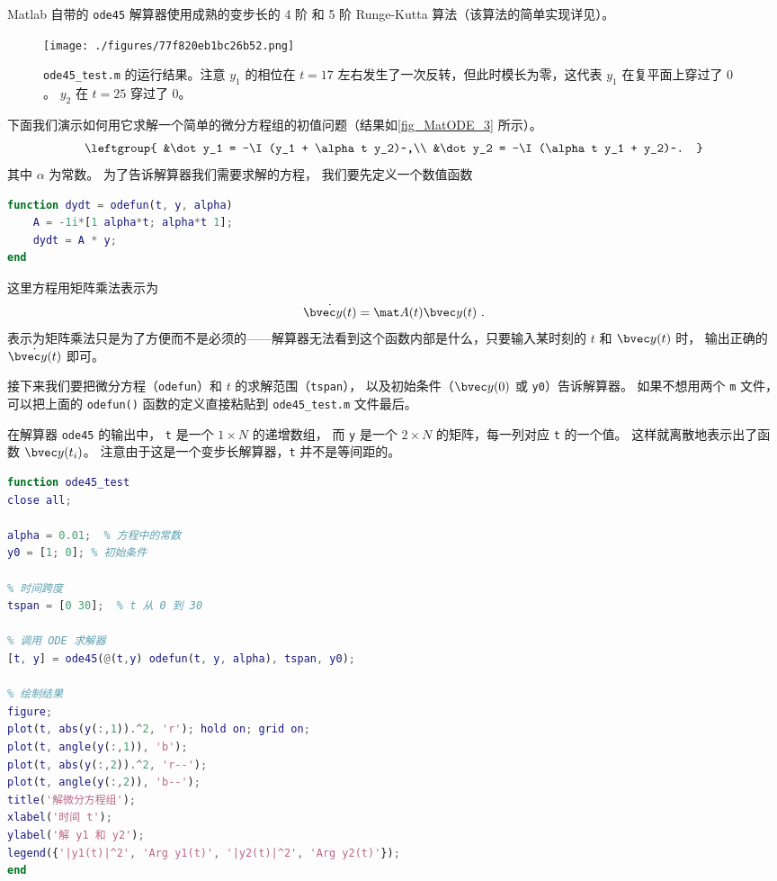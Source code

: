 

Matlab 自带的 \verb`ode45` 解算器使用成熟的变步长的 4 阶 和 5 阶 Runge-Kutta 算法（该算法的简单实现详见）。

\begin{figure}[ht]
\centering
\texttt{[image: ./figures/77f820eb1bc26b52.png]}
\caption{\verb`ode45_test.m` 的运行结果。注意 $y_1$ 的相位在 $t=17$ 左右发生了一次反转，但此时模长为零，这代表 $y_1$ 在复平面上穿过了 $0$。 $y_2$ 在 $t=25$ 穿过了 $0$。} \label{fig_MatODE_3}
\end{figure}

下面我们演示如何用它求解一个简单的微分方程组的初值问题（结果如\autoref{fig_MatODE_3} 所示）。
\begin{equation}
\leftgroup{
&\dot y_1 = -\I (y_1 + \alpha t y_2)~,\\
&\dot y_2 = -\I (\alpha t y_1 + y_2)~.
}\end{equation}
其中 $\alpha$ 为常数。 为了告诉解算器我们需要求解的方程， 我们要先定义一个数值函数
\begin{lstlisting}[language=matlab,caption=odefun.m]
function dydt = odefun(t, y, alpha)
    A = -1i*[1 alpha*t; alpha*t 1];
    dydt = A * y;
end
\end{lstlisting}
这里方程用矩阵乘法表示为
\begin{equation}
\dot{\bvec y(t)} = \mat A(t) \bvec y(t)~.
\end{equation}
表示为矩阵乘法只是为了方便而不是必须的——解算器无法看到这个函数内部是什么，只要输入某时刻的 $t$ 和 $\bvec y(t)$ 时， 输出正确的 $\dot{\bvec y(t)}$ 即可。

接下来我们要把微分方程（\verb`odefun`）和 $t$ 的求解范围（\verb`tspan`）， 以及初始条件（$\bvec y(0)$ 或 \verb`y0`）告诉解算器。 如果不想用两个 \verb`m` 文件， 可以把上面的 \verb`odefun()` 函数的定义直接粘贴到 \verb`ode45_test.m` 文件最后。

在解算器 \verb`ode45` 的输出中， \verb`t` 是一个 $1\times N$ 的递增数组， 而 \verb`y` 是一个 $2\times N$ 的矩阵，每一列对应 \verb`t` 的一个值。 这样就离散地表示出了函数 $\bvec y(t_i)$。 注意由于这是一个变步长解算器，\verb`t` 并不是等间距的。
\begin{lstlisting}[language=matlab,caption=ode45\_test.m]
function ode45_test
close all;

alpha = 0.01;  % 方程中的常数
y0 = [1; 0]; % 初始条件

% 时间跨度
tspan = [0 30];  % t 从 0 到 30

% 调用 ODE 求解器
[t, y] = ode45(@(t,y) odefun(t, y, alpha), tspan, y0);

% 绘制结果
figure;
plot(t, abs(y(:,1)).^2, 'r'); hold on; grid on;
plot(t, angle(y(:,1)), 'b');
plot(t, abs(y(:,2)).^2, 'r--');
plot(t, angle(y(:,2)), 'b--');
title('解微分方程组');
xlabel('时间 t');
ylabel('解 y1 和 y2');
legend({'|y1(t)|^2', 'Arg y1(t)', '|y2(t)|^2', 'Arg y2(t)'});
end
\end{lstlisting}
